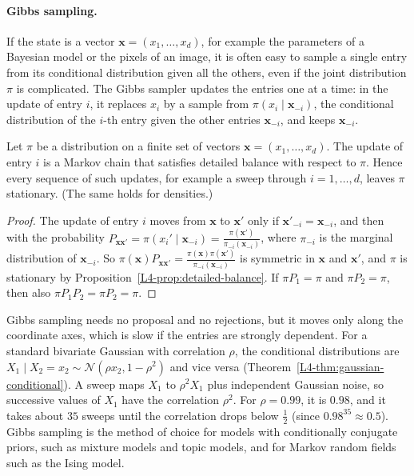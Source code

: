 \paragraph{Gibbs sampling.} If the state is a vector $\mathbf{x} = (x_1, \ldots, x_d)$, for example the parameters of a Bayesian model or the pixels of an image, it is often easy to sample a single entry from its conditional distribution given all the others, even if the joint distribution $\pi$ is complicated. The Gibbs sampler updates the entries one at a time: in the update of entry $i$, it replaces $x_i$ by a sample from $\pi(x_i \mid \mathbf{x}_{-i})$, the conditional distribution of the $i$-th entry given the other entries $\mathbf{x}_{-i}$, and keeps $\mathbf{x}_{-i}$.

\begin{proposition}\label{L4-prop:gibbs}
    Let $\pi$ be a distribution on a finite set of vectors $\mathbf{x} = (x_1, \ldots, x_d)$. The update of entry $i$ is a Markov chain that satisfies detailed balance with respect to $\pi$. Hence every sequence of such updates, for example a sweep through $i = 1, \ldots, d$, leaves $\pi$ stationary. (The same holds for densities.)
\end{proposition}

\begin{proof}
    The update of entry $i$ moves from $\mathbf{x}$ to $\mathbf{x}'$ only if $\mathbf{x}'_{-i} = \mathbf{x}_{-i}$, and then with the probability $P_{\mathbf{x}\mathbf{x}'} = \pi(x_i' \mid \mathbf{x}_{-i}) = \frac{\pi(\mathbf{x}')}{\pi_{-i}(\mathbf{x}_{-i})}$, where $\pi_{-i}$ is the marginal distribution of $\mathbf{x}_{-i}$. So $\pi(\mathbf{x})P_{\mathbf{x}\mathbf{x}'} = \frac{\pi(\mathbf{x})\pi(\mathbf{x}')}{\pi_{-i}(\mathbf{x}_{-i})}$ is symmetric in $\mathbf{x}$ and $\mathbf{x}'$, and $\pi$ is stationary by Proposition~\ref{L4-prop:detailed-balance}. If $\pi P_1 = \pi$ and $\pi P_2 = \pi$, then also $\pi P_1P_2 = \pi P_2 = \pi$.
\end{proof}

Gibbs sampling needs no proposal and no rejections, but it moves only along the coordinate axes, which is slow if the entries are strongly dependent. For a standard bivariate Gaussian with correlation $\rho$, the conditional distributions are $X_1 \mid X_2 = x_2 \sim \mathcal{N}(\rho x_2, 1 - \rho^2)$ and vice versa (Theorem~\ref{L4-thm:gaussian-conditional}). A sweep maps $X_1$ to $\rho^2X_1$ plus independent Gaussian noise, so successive values of $X_1$ have the correlation $\rho^2$. For $\rho = 0.99$, it is $0.98$, and it takes about $35$ sweeps until the correlation drops below $\frac{1}{2}$ (since $0.98^{35} \approx 0.5$). Gibbs sampling is the method of choice for models with conditionally conjugate priors, such as mixture models and topic models, and for Markov random fields such as the Ising model.


